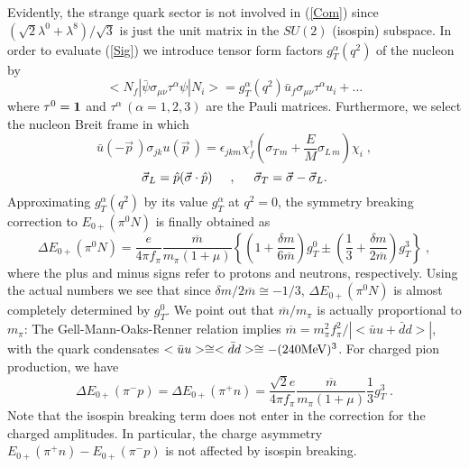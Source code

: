 Evidently, the strange quark sector is not involved in (\ref{Com})
since $(\sqrt{2}\lambda^0 +\lambda^8)/\sqrt{3}$ is just the unit
matrix in the $SU(2)$ (isospin) subspace. In order to evaluate (\ref{Sig})
we introduce tensor form factors $g_{T}^{\alpha}(q^2)$ of the nucleon by
\begin{equation}
\label{For}
<N_f| \bar{\psi}\sigma_{\mu\nu}\tau^{\alpha}\psi|N_i>
= g_T^{\alpha}(q^2)\bar{u}_f\sigma_{\mu\nu}
 \tau^{\alpha} u_i + \ldots
\end{equation}
where $\tau^0={\bf 1}$ and $\tau^\alpha \,(\alpha=1,2,3)$ are the Pauli
matrices. Furthermore, we select the nucleon Breit frame in which
\begin{equation}
\label{Breit}
\bar{u}(-\vec{p}\,)\sigma_{jk}u(\vec{p}\,)=\epsilon_{jkm}\chi^{\dagger}_f 
(\sigma_{T\, m} +\frac{E}{M} \sigma_{L\, m})\chi_i \; ,
\end{equation} 
\begin{equation}
\vec{\sigma}_{L}=\hat{p}(\vec{\sigma}\cdot\hat{p})  \hspace{0.5cm},
\hspace{0.5cm}
\vec{\sigma}_{T}=\vec{\sigma}-\vec{\sigma}_{L} .
\end{equation}
Approximating $g_T^\alpha (q^2 )$ by its value $g_T^\alpha $ at $q^2=0$,
the symmetry breaking correction to $E_{0+}(\pi^0 N)$ is finally obtained as
\begin{equation}
\label{result}
\Delta E_{0+}(\pi^0 N) = \frac{e}{4\pi f_\pi}\frac{\overline{m}}{m_\pi (1+\mu)}
  \left\{ \left( 1+\frac{\delta m}{6\overline{m}} \right) g_T^0
     \pm \left(\frac{1}{3}+\frac{\delta m}{2\overline{m}}\right) g_T^3
     \right\} \; ,
\end{equation}
where  the plus and minus signs refer to protons and neutrons, respectively.
Using the actual numbers we see that since $\delta m/2\overline{m} \cong -1/3$,
$\Delta E_{0+}(\pi^0 N)$ is almost completely determined by $g_T^0$. We point
out that $\overline{m}/m_\pi$ is actually proportional to $m_\pi$: The
Gell-Mann-Oaks-Renner relation implies $\overline{m}=m_\pi^2f_\pi^2
/|<\bar{u}u+\bar{d}d>|$, with the quark condensates $<\bar{u}u>\cong
<\bar{d}d>\cong -(240{\rm MeV})^3$.
For charged pion production, we have
\begin{equation}
\label{charged}
\Delta E_{0+} (\pi^- p)= \Delta E_{0+} (\pi^+ n) = 
\frac{\sqrt{2}e}{4\pi f_\pi} \frac{\overline{m}}{m_\pi (1+\mu) }
 \frac{1}{3} g_T^3\; .
\end{equation}
Note  that the isospin breaking term does not enter in the correction for
the charged amplitudes. In particular, the charge asymmetry $E_{0+}(\pi^+ n)
-E_{0+}(\pi^- p)$ is not affected by isospin breaking.


